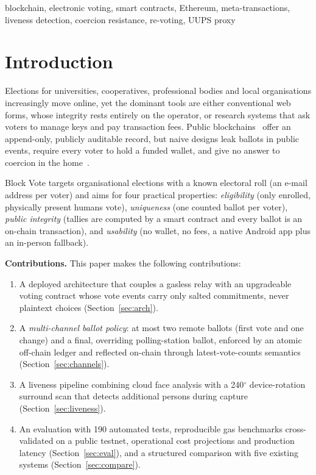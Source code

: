 \documentclass[conference]{IEEEtran}
\begin{document}
\begin{IEEEkeywords}
blockchain, electronic voting, smart contracts, Ethereum, meta-transactions, liveness detection, coercion resistance, re-voting, UUPS proxy
\end{IEEEkeywords}

\section{Introduction}
Elections for universities, cooperatives, professional bodies and local organisations increasingly move online, yet the dominant tools are either conventional web forms, whose integrity rests entirely on the operator, or research systems that ask voters to manage keys and pay transaction fees. Public blockchains~\cite{nakamoto2008,wood2014} offer an append-only, publicly auditable record, but naive designs leak ballots in public events, require every voter to hold a funded wallet, and give no answer to coercion in the home~\cite{park2021}.

Block Vote targets organisational elections with a known electoral roll (an e-mail address per voter) and aims for four practical properties: \emph{eligibility} (only enrolled, physically present humans vote), \emph{uniqueness} (one counted ballot per voter), \emph{public integrity} (tallies are computed by a smart contract and every ballot is an on-chain transaction), and \emph{usability} (no wallet, no fees, a native Android app plus an in-person fallback).

\textbf{Contributions.} This paper makes the following contributions:
\begin{enumerate}
  \item A deployed architecture that couples a gasless relay with an upgradeable voting contract whose vote events carry only salted commitments, never plaintext choices (Section~\ref{sec:arch}).
  \item A \emph{multi-channel ballot policy}: at most two remote ballots (first vote and one change) and a final, overriding polling-station ballot, enforced by an atomic off-chain ledger and reflected on-chain through latest-vote-counts semantics (Section~\ref{sec:channels}).
  \item A liveness pipeline combining cloud face analysis with a 240$^\circ$ device-rotation surround scan that detects additional persons during capture (Section~\ref{sec:liveness}).
  \item An evaluation with 190 automated tests, reproducible gas benchmarks cross-validated on a public testnet, operational cost projections and production latency (Section~\ref{sec:eval}), and a structured comparison with five existing systems (Section~\ref{sec:compare}).
\end{enumerate}
\end{document}
